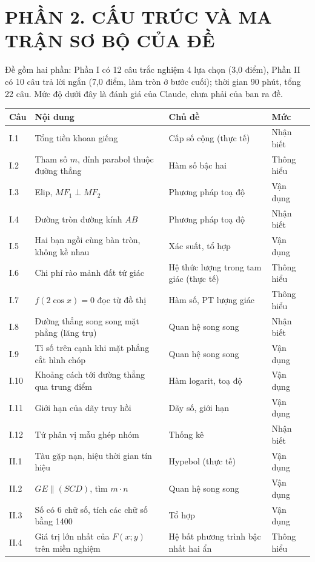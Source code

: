\documentclass[11pt,a4paper]{article}
\begin{document}
\section{PHẦN 2. CẤU TRÚC VÀ MA TRẬN SƠ BỘ CỦA ĐỀ}
Đề gồm hai phần: Phần I có 12 câu trắc nghiệm 4 lựa chọn (3,0 điểm), Phần II có 10 câu trả lời ngắn (7,0 điểm, làm tròn ở bước cuối); thời gian 90 phút, tổng 22 câu. Mức độ dưới đây là đánh giá của Claude, chưa phải của ban ra đề.

\begin{longtable}{|p{1cm}|p{7.2cm}|p{5cm}|p{2.4cm}|}
\hline\rowcolor{th}\textbf{Câu} & \textbf{Nội dung} & \textbf{Chủ đề} & \textbf{Mức}\\ \hline\endhead
I.1 & Tổng tiền khoan giếng & Cấp số cộng (thực tế) & Nhận biết\\ \hline
I.2 & Tham số $m$, đỉnh parabol thuộc đường thẳng & Hàm số bậc hai & Thông hiểu\\ \hline
I.3 & Elip, $MF_1\perp MF_2$ & Phương pháp toạ độ & Vận dụng\\ \hline
I.4 & Đường tròn đường kính $AB$ & Phương pháp toạ độ & Nhận biết\\ \hline
I.5 & Hai bạn ngồi cùng bàn tròn, không kề nhau & Xác suất, tổ hợp & Vận dụng\\ \hline
I.6 & Chi phí rào mảnh đất tứ giác & Hệ thức lượng trong tam giác (thực tế) & Thông hiểu\\ \hline
I.7 & $f(2\cos x)=0$ đọc từ đồ thị & Hàm số, PT lượng giác & Thông hiểu\\ \hline
I.8 & Đường thẳng song song mặt phẳng (lăng trụ) & Quan hệ song song & Nhận biết\\ \hline
I.9 & Tỉ số trên cạnh khi mặt phẳng cắt hình chóp & Quan hệ song song & Vận dụng\\ \hline
I.10 & Khoảng cách tới đường thẳng qua trung điểm & Hàm logarit, toạ độ & Vận dụng\\ \hline
I.11 & Giới hạn của dãy truy hồi & Dãy số, giới hạn & Vận dụng\\ \hline
I.12 & Tứ phân vị mẫu ghép nhóm & Thống kê & Nhận biết\\ \hline
II.1 & Tàu gặp nạn, hiệu thời gian tín hiệu & Hypebol (thực tế) & Vận dụng\\ \hline
II.2 & $GE\parallel(SCD)$, tìm $m\cdot n$ & Quan hệ song song & Vận dụng\\ \hline
II.3 & Số có 6 chữ số, tích các chữ số bằng 1400 & Tổ hợp & Vận dụng\\ \hline
II.4 & Giá trị lớn nhất của $F(x;y)$ trên miền nghiệm & Hệ bất phương trình bậc nhất hai ẩn & Thông hiểu\\ \hline

\end{longtable}
\end{document}
